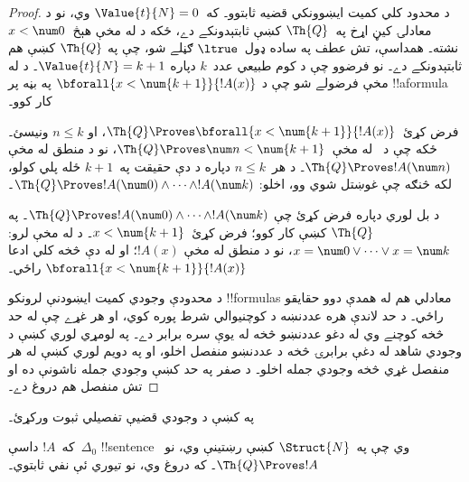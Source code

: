 \documentclass[../../../include/open-logic-section]{subfiles}
\begin{document}
\begin{proof}
    د محدود کلي کمیت ايښوونکي قضيه ثابتوو۔
    که~$\Value{t}{N} = 0$ وي، نو د معادلۍ کيڼ اړخ په~$\Th{Q}$
    کښې ثابتېدونکے دے، ځکه د
     له مخې هېڅ~$x<\num 0$
    نشته۔ همداسې، تش عطف په ساده ډول~$\ltrue$ ګڼلے شو، چې په
    $\Th{Q}$ کښې هم ثابتېدونکے دے۔
    نو فرضوو چې د کوم طبيعي عدد~$k$ دپاره
    $\Value{t}{N} = k+1$۔ د
     له مخې فرضولے شو چې د
    $\bforall{x<\num{k+1}}{!A(x)}$ په بڼه پر !!a{formula} کار کوو۔

    فرض کړئ~$\Th{Q} \Proves \bforall{x<\num{k+1}}{!A(x)}$، او
    $n \leq k$ ونيسئ۔ ځکه چې د~ له
    مخې~$\Th{Q} \Proves \num n < \num{k+1}$، نو د منطق له مخې
    $\Th{Q} \Proves !A(\num n)$۔ د هر~$n \leq k$ دپاره د دې حقيقت
    په~$k+1$ ځله پلي کولو، لکه څنګه چې غوښتل شوي وو، اخلو:
    $\Th{Q} \Proves !A(\num 0) \land \dots \land !A(\num k)$۔

    د بل لوري دپاره فرض کړئ چې
    $\Th{Q} \Proves !A(\num 0) \land \dots \land !A(\num k)$۔ په
    $\Th{Q}$ کښې کار کوو؛ فرض کړئ~$x < \num{k+1}$۔ د
     له مخې لرو:
    $x = \num 0 \lor \dots \lor x = \num k$، نو د منطق له مخې
    $!A(x)$؛ او له دې څخه کلي ادعا
    $\bforall{x<\num{k+1}}{!A(x)}$ راځي۔

    د محدودې وجودي کمیت ايښودنې لرونکو !!{formula}s معادلي هم له همدې دوو حقايقو راځي۔ د حد لاندې هره عددنښه د کوچنيوالي شرط پوره کوي، او هر غړے چې له حد څخه کوچنے وي له دغو عددنښو څخه له يوې سره برابر دے۔ په لومړي لوري کښې د وجودي شاهد له دغې برابرۍ څخه د عددنښو منفصل اخلو، او په دويم لوري کښې له هر منفصل غړي څخه وجودي جمله اخلو۔ د صفر په حد کښې وجودي جمله ناشونې ده او تش منفصل هم دروغ دے۔
\end{proof}

\begin{prob}
په  کښې د وجودي قضيې تفصيلي ثبوت
ورکړئ۔
\end{prob}

\begin{lem}
که~$!A$ داسې~$\Delta_0$ !!{sentence} وي چې په~$\Struct{N}$ کښې
رښتينې وي، نو~$\Th{Q} \Proves !A$۔ که دروغ وي، نو تيوري ئې نفي ثابتوي۔
\end{lem}
\end{document}
